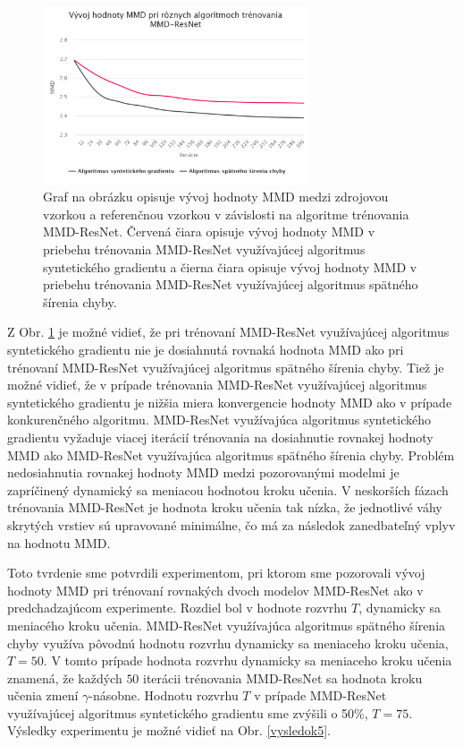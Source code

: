 \begin{figure}
\centerline{\includegraphics[width=0.7\textwidth]{images/experimenty/experiment4.png}}
\caption[Vývoj hodnoty MMD pri rôznych algoritmoch trénovania MMD-ResNet]{Graf na obrázku opisuje vývoj hodnoty MMD medzi zdrojovou vzorkou a referenčnou vzorkou v závislosti na algoritme trénovania MMD-ResNet. Červená čiara opisuje vývoj hodnoty MMD v priebehu trénovania MMD-ResNet využívajúcej algoritmus syntetického gradientu a čierna čiara opisuje vývoj hodnoty MMD v priebehu trénovania MMD-ResNet využívajúcej algoritmus spätného šírenia chyby.}
\label{vysledok4}
\end{figure}

Z Obr. \ref{vysledok4} je možné vidieť, že pri trénovaní MMD-ResNet využívajúcej algoritmus syntetického gradientu nie je dosiahnutá rovnaká hodnota MMD ako pri trénovaní MMD-ResNet využívajúcej algoritmus spätného šírenia chyby. Tiež je možné vidieť, že v prípade trénovania MMD-ResNet využívajúcej algoritmus syntetického gradientu je nižšia miera konvergencie hodnoty MMD ako v prípade konkurenčného algoritmu. MMD-ResNet využívajúca algoritmus syntetického gradientu vyžaduje viacej iterácií trénovania na dosiahnutie rovnakej hodnoty MMD ako MMD-ResNet využívajúca algoritmus späťného šírenia chyby. Problém nedosiahnutia rovnakej hodnoty MMD medzi pozorovanými modelmi je zapríčinený dynamický sa meniacou hodnotou kroku učenia. V neskorších fázach trénovania MMD-ResNet je hodnota kroku učenia tak nízka, že jednotlivé váhy skrytých vrstiev sú upravované minimálne, čo má za následok zanedbateľný vplyv na hodnotu MMD.

Toto tvrdenie sme potvrdili experimentom, pri ktorom sme pozorovali vývoj hodnoty MMD pri trénovaní rovnakých dvoch modelov MMD-ResNet ako v predchadzajúcom experimente. Rozdiel bol v hodnote rozvrhu $T$, dynamicky sa meniacého kroku učenia. MMD-ResNet využívajúca algoritmus spätného šírenia chyby využíva pôvodnú hodnotu rozvrhu dynamicky sa meniaceho kroku učenia, $T=50$. V tomto prípade hodnota rozvrhu dynamicky sa meniaceho kroku učenia znamená, že každých $50$ iterácii trénovania MMD-ResNet sa hodnota kroku učenia zmení $\gamma$-násobne. Hodnotu rozvrhu $T$ v prípade MMD-ResNet využívajúcej algoritmus syntetického gradientu sme zvýšili o 50\%, $T=75$. Výsledky experimentu je možné vidieť na Obr. \ref{vysledok5}.

